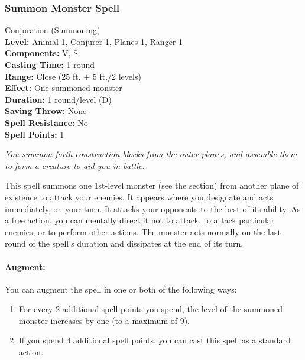 \subsubsection[Summon Monster]{Summon Monster Spell}
\label{Spell:SummonMonster}
Conjuration (Summoning)
\\ \textbf{Level:} Animal 1, Conjurer 1, Planes 1, Ranger 1
\\ \textbf{Components:} V, S
\\ \textbf{Casting Time:} 1 round
\\ \textbf{Range:} Close (25 ft. + 5 ft./2 levels)
\\ \textbf{Effect:} One summoned monster
\\ \textbf{Duration:} 1 round/level (D)
\\ \textbf{Saving Throw:} None
\\ \textbf{Spell Resistance:} No
\\ \textbf{Spell Points:} 1

\emph{You summon forth construction blocks from the outer planes, and assemble them to form a creature to aid you in battle.}

This spell summons one 1st-level monster (see the  section) from another plane of existence to attack your enemies. 
It appears where you designate and acts immediately, on your turn. It attacks your opponents to the best of its ability. 
As a free action, you can mentally direct it not to attack, to attack particular enemies, or to perform other actions. 
The monster acts normally on the last round of the spell's duration and dissipates at the end of its turn.

\paragraph{Augment:} You can augment the spell in one or both of the following ways: 
\begin{enumerate}
 \item For every 2 additional spell points you spend, the level of the summoned monster increases by one (to a maximum of 9).
 \item If you spend 4 additional spell points, you can cast this spell as a standard action.
\end{enumerate}

